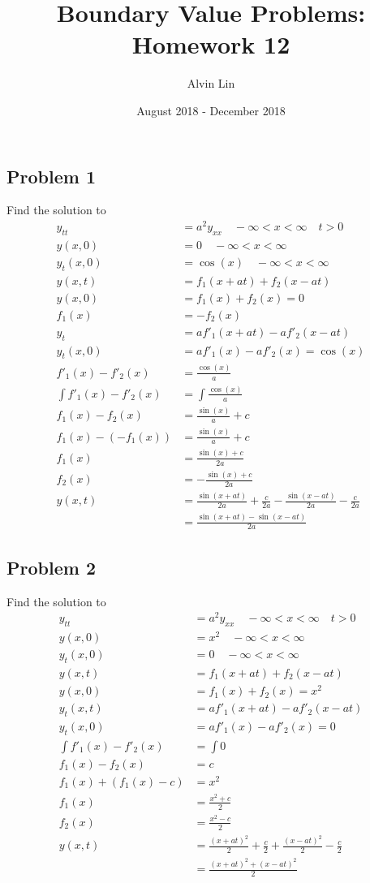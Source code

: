 \documentclass{math}
\title{Boundary Value Problems: Homework 12}
\author{Alvin Lin}
\date{August 2018 - December 2018}
\begin{document}
\maketitle

\subsection*{Problem 1}
Find the solution to
\begin{align*}
  y_{tt} &= a^2y_{xx} \quad -\infty<x<\infty \quad t>0 \\
  y(x,0) &= 0 \quad -\infty<x<\infty \\
  y_t(x,0) &= \cos(x) \quad -\infty<x<\infty \\
  y(x,t) &= f_1(x+at)+f_2(x-at) \\
  y(x,0) &= f_1(x)+f_2(x) = 0 \\
  f_1(x) &= -f_2(x) \\
  y_t &= af'_1(x+at)-af'_2(x-at) \\
  y_t(x,0) &= af'_1(x)-af'_2(x) = \cos(x) \\
  f'_1(x)-f'_2(x) &= \frac{\cos(x)}{a} \\
  \int f'_1(x)-f'_2(x) &= \int\frac{\cos(x)}{a} \\
  f_1(x)-f_2(x) &= \frac{\sin(x)}{a}+c \\
  f_1(x)-(-f_1(x)) &= \frac{\sin(x)}{a}+c \\
  f_1(x) &= \frac{\sin(x)+c}{2a} \\
  f_2(x) &= -\frac{\sin(x)+c}{2a} \\
  y(x,t) &= \frac{\sin(x+at)}{2a}+\frac{c}{2a}-
    \frac{\sin(x-at)}{2a}-\frac{c}{2a} \\
  &= \frac{\sin(x+at)-\sin(x-at)}{2a}
\end{align*}

\subsection*{Problem 2}
Find the solution to
\begin{align*}
  y_{tt} &= a^2y_{xx} \quad -\infty<x<\infty \quad t>0 \\
  y(x,0) &= x^2 \quad -\infty<x<\infty \\
  y_t(x,0) &= 0 \quad -\infty<x<\infty \\
  y(x,t) &= f_1(x+at)+f_2(x-at) \\
  y(x,0) &= f_1(x)+f_2(x) = x^2 \\
  y_t(x,t) &= af'_1(x+at)-af'_2(x-at) \\
  y_t(x,0) &= af'_1(x)-af'_2(x) = 0 \\
  \int f'_1(x)-f'_2(x) &= \int0 \\
  f_1(x)-f_2(x) &= c \\
  f_1(x)+(f_1(x)-c) &= x^2 \\
  f_1(x) &= \frac{x^2+c}{2} \\
  f_2(x) &= \frac{x^2-c}{2} \\
  y(x,t) &= \frac{(x+at)^2}{2}+\frac{c}{2}+\frac{(x-at)^2}{2}-\frac{c}{2} \\
  &= \frac{(x+at)^2+(x-at)^2}{2}
\end{align*}
\end{document}
